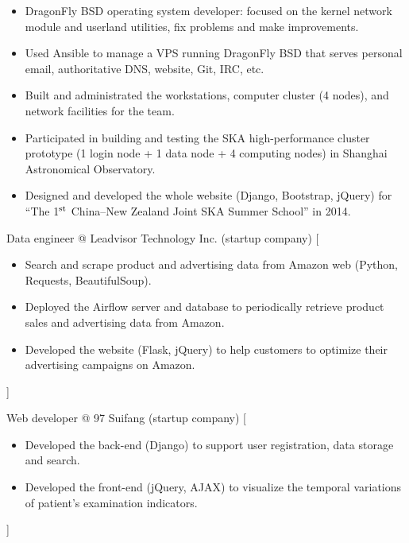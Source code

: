 \documentclass{resume}
\begin{document}
\begin{itemize}
  \item DragonFly BSD operating system developer:
    focused on the kernel network module and userland utilities,
    fix problems and make improvements.
  \item Used Ansible to manage a VPS running DragonFly BSD that serves
    personal email, authoritative DNS, website, Git, IRC, etc.
  \item Built and administrated the workstations, computer cluster
    (4 nodes), and network facilities for the team.
  \item Participated in building and testing the SKA high-performance
    cluster prototype (1 login node + 1 data node + 4 computing nodes)
    in Shanghai Astronomical Observatory.
  \item Designed and developed the whole website (Django, Bootstrap, jQuery)
    for \enquote{The 1$^{\rm st}$ China--New Zealand Joint SKA Summer School}
    in 2014.
\end{itemize}

\begin{experiences}
    {Data engineer @ Leadvisor Technology Inc. (startup company)}%
    [\begin{itemize}
      \item Search and scrape product and advertising data from Amazon web
        (Python, Requests, BeautifulSoup).
      \item Deployed the Airflow server and database to periodically
        retrieve product sales and advertising data from Amazon.
      \item Developed the website (Flask, jQuery) to help customers to
        optimize their advertising campaigns on Amazon.
    \end{itemize}]%

  \separator{0.5em}
    {Web developer @ 97 Suifang (startup company)}%
    [\begin{itemize}
      \item Developed the back-end (Django) to support user registration,
        data storage and search.
      \item Developed the front-end (jQuery, AJAX) to visualize the
        temporal variations of patient's examination indicators.
    \end{itemize}]%
\end{experiences}
\end{document}
